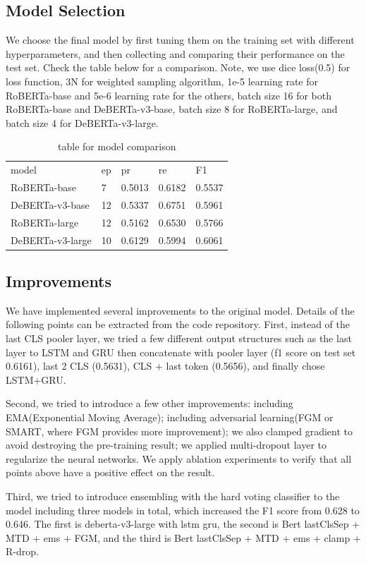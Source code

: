 \documentclass[11pt,a4paper]{article}
\begin{document}
\subsection{Model Selection}
We choose the final model by first tuning them on the training set with different hyperparameters, and then collecting and comparing their performance on the test set. Check the table below for a comparison. Note, we use dice loss(0.5) for loss function, 3N for weighted sampling algorithm, 1e-5 learning rate for RoBERTa-base and 5e-6 learning rate for the others, batch size 16 for both RoBERTa-base and DeBERTa-v3-base\cite{he2021debertav3}, batch size 8 for RoBERTa-large, and batch size 4 for DeBERTa-v3-large. 
\begin{table}[h!]
\begin{tabular}{lllll}
model            & ep & pr     & re     & F1     \\
RoBERTa-base     & 7  & 0.5013 & 0.6182 & 0.5537 \\
DeBERTa-v3-base  & 12 & 0.5337 & 0.6751 & 0.5961 \\
RoBERTa-large    & 12 & 0.5162 & 0.6530 & 0.5766 \\
DeBERTa-v3-large & 10 & 0.6129 & 0.5994 & 0.6061
\end{tabular}
\caption{table for model comparison}
\end{table}
\subsection{Improvements}
We have implemented several improvements to the original model. Details of the following points can be extracted from the code repository. First, instead of the last CLS pooler layer, we tried a few different output structures such as the last layer to LSTM and GRU then concatenate with pooler layer (f1 score on test set 0.6161), last 2 CLS (0.5631), CLS + last token (0.5656), and finally chose LSTM+GRU.

Second, we tried to introduce a few other improvements: including EMA(Exponential Moving Average); including adversarial learning(FGM or SMART\cite{2020}, where FGM provides more improvement); we also clamped gradient to avoid destroying the pre-training result; we applied multi-dropout layer to regularize the neural networks. We apply ablation experiments to verify that all points above have a positive effect on the result.

Third, we tried to introduce ensembling with the hard voting classifier to the model including three models in total, which increased the F1 score from 0.628 to 0.646. The first is deberta-v3-large with lstm gru, the second is Bert lastClsSep + MTD + ems + FGM, and the third is Bert lastClsSep + MTD + ems + clamp + R-drop.
\end{document}

